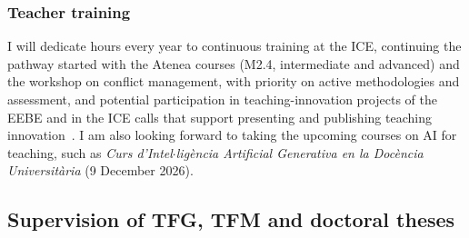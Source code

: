 \documentclass[11pt]{article}
\begin{document}
\subsubsection{Teacher training}

I will dedicate hours every year to continuous training at the ICE, continuing the pathway started with the Atenea courses (M2.4, intermediate and advanced) and the workshop on conflict management, with priority on active methodologies and assessment, and potential participation in teaching-innovation projects of the EEBE and in the ICE calls that support presenting and publishing teaching innovation~\cite{ICEAjuts2025}. I am also looking forward to taking the upcoming courses on AI for teaching, such as \textit{Curs d'Intel$\cdot$lig\`encia Artificial Generativa en la Doc\`encia Universit\`aria} (9 December 2026).


\subsection{Supervision of TFG, TFM and doctoral theses}\label{sec:theses}
\end{document}
